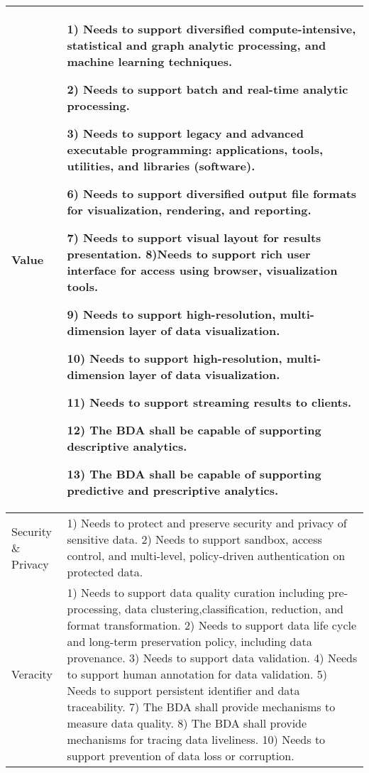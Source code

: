 \documentclass[conference]{IEEEtran}
\begin{document}
\begin{center}
\begin{table*}
\begin{tabular}{ | m{1.5cm} | m{14.5cm} |}
        \\

        \hline

        Value & 
        
        1) Needs to support diversified compute-intensive, statistical and graph analytic processing, and machine learning techniques. 
        
        2) Needs to support batch and real-time analytic processing. 
        
        3) Needs to support legacy and advanced executable programming: applications, tools, utilities, and libraries (software). 
        
        6) Needs to support diversified output file formats for visualization, rendering, and reporting. 
        
        7) Needs to support visual layout for results presentation. 8)Needs to support rich user interface for access using browser, visualization tools. 
        
        9) Needs to support high-resolution, multi-dimension layer of data visualization. 
        
        10) Needs to support high-resolution, multi-dimension layer of data visualization. 
        
        11) Needs to support streaming results to clients. 
        
        12) The BDA shall be capable of supporting descriptive analytics. 
        
        13) The BDA shall be capable of supporting predictive and prescriptive analytics.
        
        \\
        \hline

        Security \& Privacy & 1) Needs to protect and preserve security and privacy of sensitive data. 
        2) Needs to support sandbox, access control, and multi-level, policy-driven authentication on  protected data. 
        
        \\

        \hline
        
        Veracity & 1) Needs to support data quality curation including pre-processing, data clustering,classification, reduction, and format transformation. 2) Needs to support data life cycle and long-term preservation policy, including data provenance. 3) Needs to support data validation. 4) Needs to support human annotation for data validation. 5) Needs to support persistent identifier and data traceability.
        7) The BDA shall provide mechanisms to measure data quality. 8) The BDA shall provide mechanisms for tracing data liveliness. 10) Needs to support prevention of data loss or corruption.
        \\


\end{tabular}
\end{table*}
\end{center}
\end{document}
